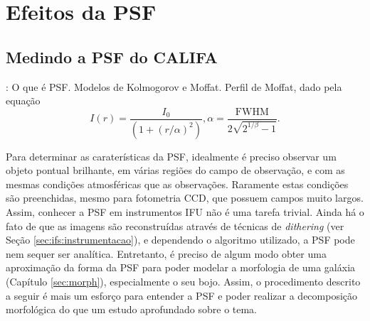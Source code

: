 


\chapter{Efeitos da PSF}
\label{sec:psf}


\section{Medindo a PSF do CALIFA}

\TODO: O que é PSF. Modelos de Kolmogorov e Moffat.
Perfil de Moffat, dado pela equação
$$
I(r) = \frac{I_0}{\left(1 + (r / \alpha)^2\right)},
\alpha = \frac{\mathrm{FWHM}}{2\sqrt{2^{1/\beta} - 1}}.
$$

Para determinar as caraterísticas da PSF, idealmente é preciso observar um
objeto pontual brilhante, em várias regiões do campo de observação, e com as
mesmas condições atmosféricas que as observações. Raramente estas condições são
preenchidas, mesmo para fotometria CCD, que possuem campos muito largos. Assim,
conhecer a PSF em instrumentos IFU não é uma tarefa trivial. Ainda há o fato de
que as imagens são reconstruídas através de técnicas de {\em dithering} (ver
Seção \ref{sec:ifs:instrumentacao}), e dependendo o algoritmo utilizado, a PSF
pode nem sequer ser analítica. Entretanto, é preciso de algum modo obter uma
aproximação da forma da PSF para poder modelar a morfologia de uma galáxia
(Capítulo \ref{sec:morph}), especialmente o seu bojo. Assim, o procedimento
descrito a seguir é mais um esforço para entender a PSF e poder realizar a
decomposição morfológica do que um estudo aprofundado sobre o tema.


